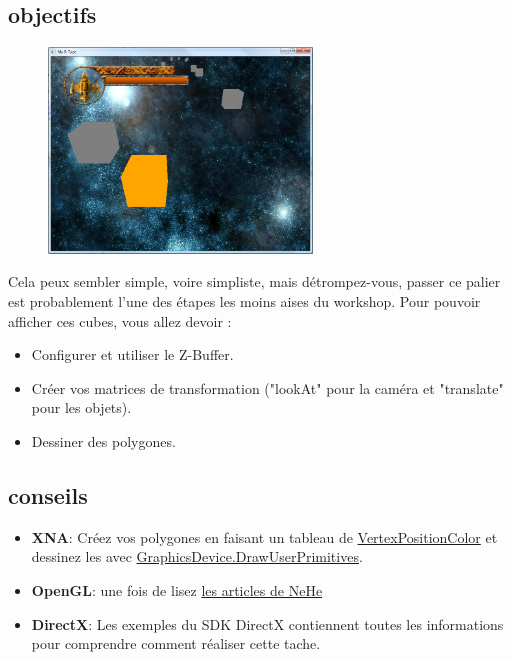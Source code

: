 \documentclass[12pt,a4paper]{report}
\begin{document}
\subsection{objectifs}
\begin{figure}[!h]\centering\includegraphics[width=7cm]{cube_window.png}\end{figure}
Cela peux sembler simple, voire simpliste, mais détrompez-vous, passer ce palier est probablement l'une des
étapes les moins aises du workshop. Pour pouvoir afficher ces cubes, vous allez devoir :
\begin{itemize}
\item Configurer et utiliser le Z-Buffer.
\item Créer vos matrices de transformation ("lookAt" pour la caméra et "translate" pour les objets).
\item Dessiner des polygones.
\end{itemize}

\subsection{conseils}
\begin{itemize}
\item \textbf{XNA}: Créez vos polygones en faisant un tableau de \href{http://msdn.microsoft.com/en-us/library/microsoft.xna.framework.graphics.vertexpositioncolor.aspx}{VertexPositionColor} et dessinez les avec 
\href{http://msdn.microsoft.com/en-us/library/bb196411.aspx}{GraphicsDevice.DrawUserPrimitives}.
\item \textbf{OpenGL}: une fois de lisez \href{http://nehe.gamedev.net/tutorial/3d_shapes/10035/}{les articles de NeHe}
\item \textbf{DirectX}: Les exemples du SDK DirectX contiennent toutes les informations pour comprendre comment réaliser cette tache.
\end{itemize}
\newpage
\end{document}
